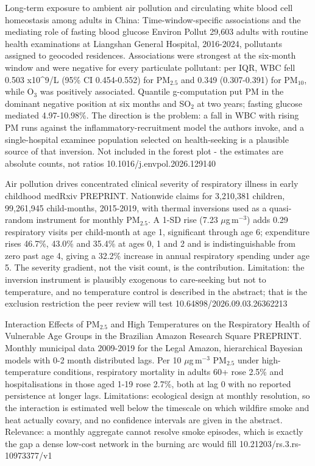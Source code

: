 \documentclass[10pt]{article}
\begin{document}

{Long-term exposure to ambient air pollution and circulating white blood cell homeostasis among adults in China: Time-window-specific associations and the mediating role of fasting blood glucose}
{Environ Pollut}
{29,603 adults with routine health examinations at Liangshan General Hospital, 2016-2024, pollutants assigned to geocoded residences. Associations were strongest at the six-month window and were negative for every particulate pollutant: per IQR, WBC fell 0.503 x10\textasciicircum{}9/L (95\% CI 0.454-0.552) for PM$_{2.5}$ and 0.349 (0.307-0.391) for PM$_{10}$, while O$_3$ was positively associated. Quantile g-computation put PM in the dominant negative position at six months and SO$_2$ at two years; fasting glucose mediated 4.97-10.98\%. The direction is the problem: a fall in WBC with rising PM runs against the inflammatory-recruitment model the authors invoke, and a single-hospital examinee population selected on health-seeking is a plausible source of that inversion. Not included in the forest plot - the estimates are absolute counts, not ratios}
{10.1016/j.envpol.2026.129140}


{Air pollution drives concentrated clinical severity of respiratory illness in early childhood}
{medRxiv}
{PREPRINT. Nationwide claims for 3,210,381 children, 99,261,945 child-months, 2015-2019, with thermal inversions used as a quasi-random instrument for monthly PM$_{2.5}$. A 1-SD rise (7.23 $\mu$g\,m$^{-3}$) adds 0.29 respiratory visits per child-month at age 1, significant through age 6; expenditure rises 46.7\%, 43.0\% and 35.4\% at ages 0, 1 and 2 and is indistinguishable from zero past age 4, giving a 32.2\% increase in annual respiratory spending under age 5. The severity gradient, not the visit count, is the contribution. Limitation: the inversion instrument is plausibly exogenous to care-seeking but not to temperature, and no temperature control is described in the abstract; that is the exclusion restriction the peer review will test}
{10.64898/2026.09.03.26362213}

{Interaction Effects of PM$_{2.5}$ and High Temperatures on the Respiratory Health of Vulnerable Age Groups in the Brazilian Amazon}
{Research Square}
{PREPRINT. Monthly municipal data 2009-2019 for the Legal Amazon, hierarchical Bayesian models with 0-2 month distributed lags. Per 10 $\mu$g\,m$^{-3}$ PM$_{2.5}$ under high-temperature conditions, respiratory mortality in adults 60+ rose 2.5\% and hospitalisations in those aged 1-19 rose 2.7\%, both at lag 0 with no reported persistence at longer lags. Limitations: ecological design at monthly resolution, so the interaction is estimated well below the timescale on which wildfire smoke and heat actually covary, and no confidence intervals are given in the abstract. Relevance: a monthly aggregate cannot resolve smoke episodes, which is exactly the gap a dense low-cost network in the burning arc would fill}
{10.21203/rs.3.rs-10973377/v1}
\end{document}
